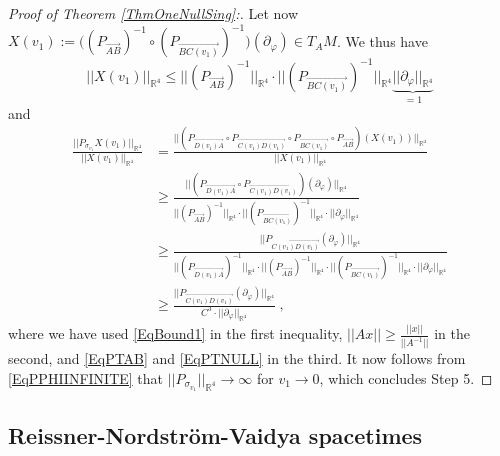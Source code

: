 \documentclass[reqno]{article}
\newcommand{\R}{\mathbb{R}}
\newcommand{\rd}{\partial}
\begin{document}
\begin{proof}[Proof of Theorem \ref{ThmOneNullSing}:]
Let now $X(v_1) :=\big((P_{\overrightarrow{AB}})^{-1} \circ (P_{\overrightarrow{BC(v_1)}})^{-1} \big) (\rd_\varphi) \in T_{A}M$. We thus have 
\begin{equation} 
\label{EqBound1}
||X(v_1)||_{\R^4} \leq ||(P_{\overrightarrow{AB}})^{-1} ||_{\R^4} \cdot ||(P_{\overrightarrow{BC(v_1)}})^{-1} ||_{\R^4} \underbrace{||\rd_\varphi||_{\R^4}}_{=1} \end{equation} 
and
\begin{equation*}
\begin{split}
\frac{||P_{\sigma_{v_1}} X(v_1)||_{\R^4}}{||X(v_1)||_{\R^4}} &= \frac{||(P_{\overrightarrow{D(v_1)A}} \circ P_{\overrightarrow{C(v_1)D(v_1)}} \circ P_{\overrightarrow{BC(v_1)}} \circ P_{\overrightarrow{AB}} )(X(v_1))||_{\R^4}}{||X(v_1)||_{\R^4}} \\
&\geq \frac{||(P_{\overrightarrow{D(v_1)A}} \circ P_{\overrightarrow{C(v_1)D(v_1)}})(\rd_\varphi)||_{\R^4}}{||(P_{\overrightarrow{AB}})^{-1} ||_{\R^4} \cdot ||(P_{\overrightarrow{BC(v_1)}})^{-1} ||_{\R^4} \cdot  ||\rd_\varphi||_{\R^4}} \\
&\geq \frac{||P_{\overrightarrow{C(v_1)D(v_1)}}(\rd_\varphi)||_{\R^4}}{||(P_{\overrightarrow{D(v_1)A}})^{-1}||_{\R^4} \cdot ||(P_{\overrightarrow{AB}})^{-1} ||_{\R^4} \cdot ||(P_{\overrightarrow{BC(v_1)}})^{-1} ||_{\R^4} \cdot ||\rd_\varphi||_{\R^4}} \\
&\geq \frac{||P_{\overrightarrow{C(v_1)D(v_1)}}(\rd_\varphi)||_{\R^4}}{C^3 \cdot  ||\rd_\varphi||_{\R^4}} \;, 
\end{split}
\end{equation*}
where we have used \eqref{EqBound1} in the first inequality, $||Ax|| \geq \frac{||x||}{||A^{-1}||}$ in the second, and  \eqref{EqPTAB} and \eqref{EqPTNULL} in the third. It now follows from  \eqref{EqPPHIINFINITE} that $||P_{\sigma_{v_1}}||_{\R^4} \to \infty$ for $v_1 \to 0$, which concludes Step 5.
\end{proof}









\subsection{Reissner-Nordstr\"om-Vaidya spacetimes} \label{SecRNV}
\end{document}
